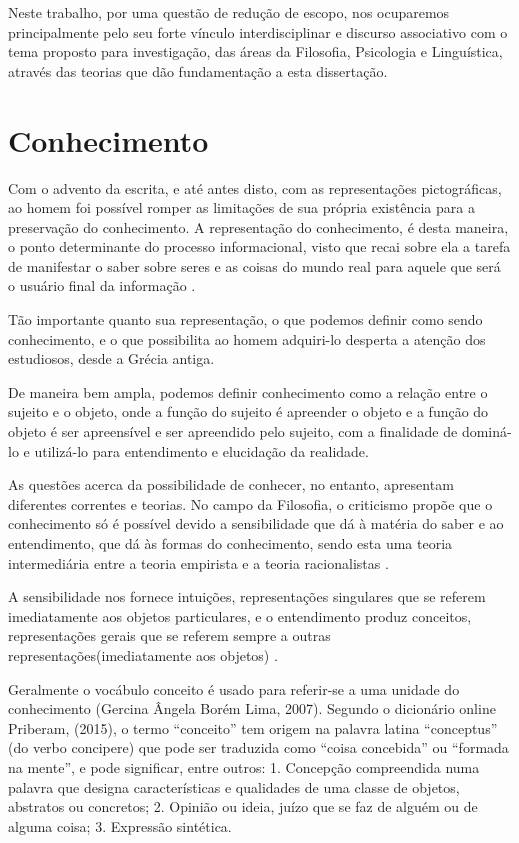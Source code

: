 Neste trabalho, por uma questão de redução de escopo, nos ocuparemos principalmente pelo seu forte vínculo interdisciplinar e discurso associativo com o tema proposto para investigação, das áreas da Filosofia, Psicologia e Linguística, através das teorias que dão fundamentação a esta dissertação.

\section{\hspace*{3pt} Conhecimento}

Com o advento da escrita, e até antes disto, com as representações pictográficas, ao homem foi possível romper as limitações de sua própria existência para a preservação do conhecimento. A representação do conhecimento, é desta maneira, o ponto determinante do processo informacional, visto que recai sobre ela a tarefa de manifestar o saber sobre seres e as coisas do mundo real para aquele que será o usuário final da informação \cite{caixeta:2008.representacao}.

Tão importante quanto sua representação, o que podemos definir como sendo conhecimento, e o que possibilita ao homem adquiri-lo desperta a atenção dos estudiosos, desde a Grécia antiga.

De maneira bem ampla, podemos definir conhecimento como a relação entre o sujeito e o objeto, onde a função do sujeito é apreender o objeto e a função do objeto é ser apreensível e ser apreendido pelo sujeito, com a finalidade de dominá-lo e utilizá-lo para entendimento e elucidação da realidade.

As questões acerca da possibilidade de conhecer, no entanto, apresentam diferentes correntes e teorias. No campo da Filosofia, o criticismo propõe que o conhecimento só é possível devido a sensibilidade que dá à matéria do saber e ao entendimento, que dá às formas do conhecimento, sendo esta uma teoria intermediária entre a teoria empirista e a teoria racionalistas \cite{kant:1983.critica}.

A sensibilidade nos fornece intuições, representações singulares que se referem imediatamente aos objetos particulares, e o entendimento produz conceitos, representações gerais que se referem sempre a outras representações(imediatamente aos objetos) \cite{pereira:2011.espaco}.

Geralmente o vocábulo conceito é usado para referir-se a uma unidade do conhecimento (Gercina Ângela Borém Lima, 2007). Segundo o dicionário online Priberam, (2015), o termo “conceito” tem origem na palavra latina “conceptus” (do verbo concipere) que pode ser traduzida como “coisa concebida” ou “formada na mente”, e pode significar, entre outros: 1. Concepção compreendida numa palavra que designa características e qualidades de uma classe de objetos, abstratos ou concretos; 2. Opinião ou ideia, juízo que se faz de alguém ou de alguma coisa; 3. Expressão sintética.


